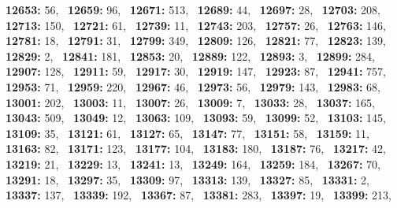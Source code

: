 \textbf{12653:} 56,\allowbreak~ 
\textbf{12659:} 96,\allowbreak~ 
\textbf{12671:} 513,\allowbreak~ 
\textbf{12689:} 44,\allowbreak~ 
\textbf{12697:} 28,\allowbreak~ 
\textbf{12703:} 208,\allowbreak~ 
\textbf{12713:} 150,\allowbreak~ 
\textbf{12721:} 61,\allowbreak~ 
\textbf{12739:} 11,\allowbreak~ 
\textbf{12743:} 203,\allowbreak~ 
\textbf{12757:} 26,\allowbreak~ 
\textbf{12763:} 146,\allowbreak~ 
\textbf{12781:} 18,\allowbreak~ 
\textbf{12791:} 31,\allowbreak~ 
\textbf{12799:} 349,\allowbreak~ 
\textbf{12809:} 126,\allowbreak~ 
\textbf{12821:} 77,\allowbreak~ 
\textbf{12823:} 139,\allowbreak~ 
\textbf{12829:} 2,\allowbreak~ 
\textbf{12841:} 181,\allowbreak~ 
\textbf{12853:} 20,\allowbreak~ 
\textbf{12889:} 122,\allowbreak~ 
\textbf{12893:} 3,\allowbreak~ 
\textbf{12899:} 284,\allowbreak~ 
\textbf{12907:} 128,\allowbreak~ 
\textbf{12911:} 59,\allowbreak~ 
\textbf{12917:} 30,\allowbreak~ 
\textbf{12919:} 147,\allowbreak~ 
\textbf{12923:} 87,\allowbreak~ 
\textbf{12941:} 757,\allowbreak~ 
\textbf{12953:} 71,\allowbreak~ 
\textbf{12959:} 220,\allowbreak~ 
\textbf{12967:} 46,\allowbreak~ 
\textbf{12973:} 56,\allowbreak~ 
\textbf{12979:} 143,\allowbreak~ 
\textbf{12983:} 68,\allowbreak~ 
\textbf{13001:} 202,\allowbreak~ 
\textbf{13003:} 11,\allowbreak~ 
\textbf{13007:} 26,\allowbreak~ 
\textbf{13009:} 7,\allowbreak~ 
\textbf{13033:} 28,\allowbreak~ 
\textbf{13037:} 165,\allowbreak~ 
\textbf{13043:} 509,\allowbreak~ 
\textbf{13049:} 12,\allowbreak~ 
\textbf{13063:} 109,\allowbreak~ 
\textbf{13093:} 59,\allowbreak~ 
\textbf{13099:} 52,\allowbreak~ 
\textbf{13103:} 145,\allowbreak~ 
\textbf{13109:} 35,\allowbreak~ 
\textbf{13121:} 61,\allowbreak~ 
\textbf{13127:} 65,\allowbreak~ 
\textbf{13147:} 77,\allowbreak~ 
\textbf{13151:} 58,\allowbreak~ 
\textbf{13159:} 11,\allowbreak~ 
\textbf{13163:} 82,\allowbreak~ 
\textbf{13171:} 123,\allowbreak~ 
\textbf{13177:} 104,\allowbreak~ 
\textbf{13183:} 180,\allowbreak~ 
\textbf{13187:} 76,\allowbreak~ 
\textbf{13217:} 42,\allowbreak~ 
\textbf{13219:} 21,\allowbreak~ 
\textbf{13229:} 13,\allowbreak~ 
\textbf{13241:} 13,\allowbreak~ 
\textbf{13249:} 164,\allowbreak~ 
\textbf{13259:} 184,\allowbreak~ 
\textbf{13267:} 70,\allowbreak~ 
\textbf{13291:} 18,\allowbreak~ 
\textbf{13297:} 35,\allowbreak~ 
\textbf{13309:} 97,\allowbreak~ 
\textbf{13313:} 139,\allowbreak~ 
\textbf{13327:} 85,\allowbreak~ 
\textbf{13331:} 2,\allowbreak~ 
\textbf{13337:} 137,\allowbreak~ 
\textbf{13339:} 192,\allowbreak~ 
\textbf{13367:} 87,\allowbreak~ 
\textbf{13381:} 283,\allowbreak~ 
\textbf{13397:} 19,\allowbreak~ 
\textbf{13399:} 213,\allowbreak~ 
